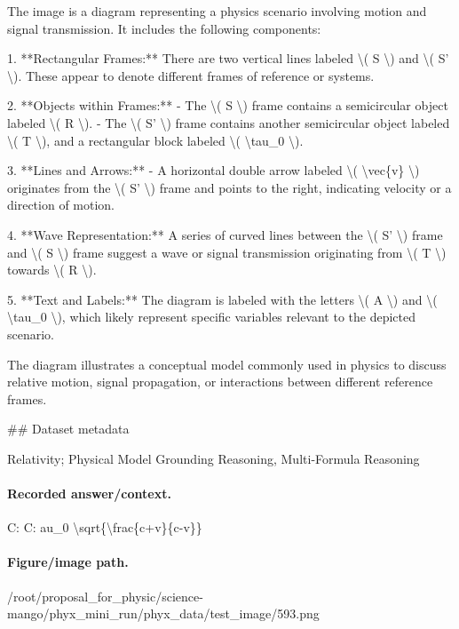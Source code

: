 The image is a diagram representing a physics scenario involving motion and signal transmission. It includes the following components:

1. **Rectangular Frames:** There are two vertical lines labeled \textbackslash{}( S \textbackslash{}) and \textbackslash{}( S' \textbackslash{}). These appear to denote different frames of reference or systems.

2. **Objects within Frames:**
   - The \textbackslash{}( S \textbackslash{}) frame contains a semicircular object labeled \textbackslash{}( R \textbackslash{}).
   - The \textbackslash{}( S' \textbackslash{}) frame contains another semicircular object labeled \textbackslash{}( T \textbackslash{}), and a rectangular block labeled \textbackslash{}( \textbackslash{}tau\_0 \textbackslash{}).

3. **Lines and Arrows:**
   - A horizontal double arrow labeled \textbackslash{}( \textbackslash{}vec\{v\} \textbackslash{}) originates from the \textbackslash{}( S' \textbackslash{}) frame and points to the right, indicating velocity or a direction of motion.

4. **Wave Representation:** A series of curved lines between the \textbackslash{}( S' \textbackslash{}) frame and \textbackslash{}( S \textbackslash{}) frame suggest a wave or signal transmission originating from \textbackslash{}( T \textbackslash{}) towards \textbackslash{}( R \textbackslash{}).

5. **Text and Labels:** The diagram is labeled with the letters \textbackslash{}( A \textbackslash{}) and \textbackslash{}( \textbackslash{}tau\_0 \textbackslash{}), which likely represent specific variables relevant to the depicted scenario.

The diagram illustrates a conceptual model commonly used in physics to discuss relative motion, signal propagation, or interactions between different reference frames.

\#\# Dataset metadata

Relativity; Physical Model Grounding Reasoning, Multi-Formula Reasoning

\paragraph{Recorded answer/context.}
C: C: 	au\_0 \textbackslash{}sqrt\{\textbackslash{}frac\{c+v\}\{c-v\}\}

\paragraph{Figure/image path.}
/root/proposal\_for\_physic/science-mango/phyx\_mini\_run/phyx\_data/test\_image/593.png

